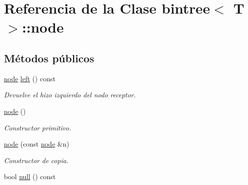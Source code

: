 \hypertarget{classbintree_1_1node}{}\section{Referencia de la Clase bintree$<$ T $>$\+:\+:node}
\label{classbintree_1_1node}
\subsection*{Métodos públicos}
\begin{DoxyCompactItemize}
\item 
\hyperlink{classbintree_1_1node}{node} \hyperlink{classbintree_1_1node_a21bdc0016677746f28b3c44bdb69c3c2}{left} () const 
\begin{DoxyCompactList}\small\item\em Devuelve el hizo izquierdo del nodo receptor. \end{DoxyCompactList}\item 
\hypertarget{classbintree_1_1node_a099e9a8cc53532127865f00159195972}{}\hyperlink{classbintree_1_1node_a099e9a8cc53532127865f00159195972}{node} ()\label{classbintree_1_1node_a099e9a8cc53532127865f00159195972}

\begin{DoxyCompactList}\small\item\em Constructor primitivo. \end{DoxyCompactList}\item 
\hyperlink{classbintree_1_1node_a1b2726b74c7059137057de34f6ce8cab}{node} (const \hyperlink{classbintree_1_1node}{node} \&n)
\begin{DoxyCompactList}\small\item\em Constructor de copia. \end{DoxyCompactList}\item 
\hypertarget{classbintree_1_1node_a9b3260cb12878a94f15b9806da984144}{}bool \hyperlink{classbintree_1_1node_a9b3260cb12878a94f15b9806da984144}{null} () const \label{classbintree_1_1node_a9b3260cb12878a94f15b9806da984144}


\end{DoxyCompactItemize}
